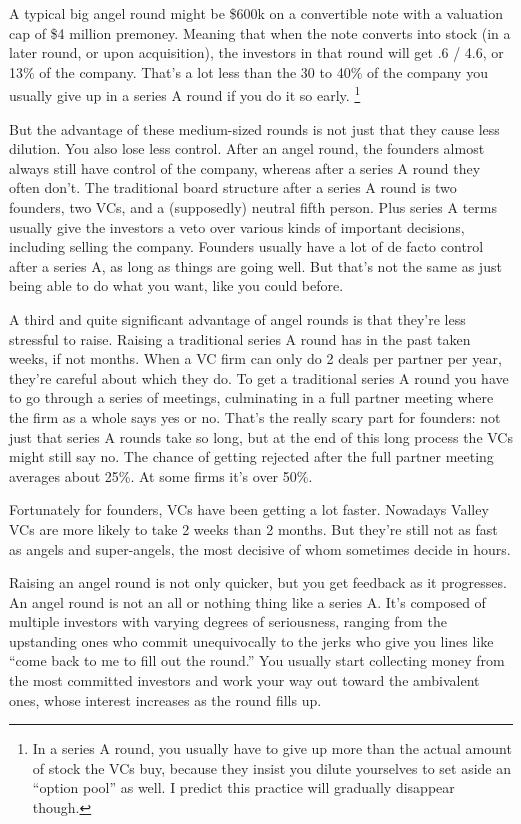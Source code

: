 A typical big angel round might be \$600k on a convertible note with a
valuation cap of \$4 million premoney. Meaning that when the note
converts into stock (in a later round, or upon acquisition), the
investors in that round will get .6 / 4.6, or 13\% of the company.
That's a lot less than the 30 to 40\% of the company you usually give up
in a series A round if you do it so early. \footnote{In a series A round, you usually have to give up more than the
actual amount of stock the VCs buy, because they insist you dilute
yourselves to set aside an ``option pool'' as well. I predict this
practice will gradually disappear though.}

But the advantage of these medium-sized rounds is not just that they
cause less dilution. You also lose less control. After an angel round,
the founders almost always still have control of the company, whereas
after a series A round they often don't. The traditional board structure
after a series A round is two founders, two VCs, and a (supposedly)
neutral fifth person. Plus series A terms usually give the investors a
veto over various kinds of important decisions, including selling the
company. Founders usually have a lot of de facto control after a series
A, as long as things are going well. But that's not the same as just
being able to do what you want, like you could before.

A third and quite significant advantage of angel rounds is that they're
less stressful to raise. Raising a traditional series A round has in the
past taken weeks, if not months. When a VC firm can only do 2 deals per
partner per year, they're careful about which they do. To get a
traditional series A round you have to go through a series of meetings,
culminating in a full partner meeting where the firm as a whole says yes
or no. That's the really scary part for founders: not just that series A
rounds take so long, but at the end of this long process the VCs might
still say no. The chance of getting rejected after the full partner
meeting averages about 25\%. At some firms it's over 50\%.

Fortunately for founders, VCs have been getting a lot faster. Nowadays
Valley VCs are more likely to take 2 weeks than 2 months. But they're
still not as fast as angels and super-angels, the most decisive of whom
sometimes decide in hours.

Raising an angel round is not only quicker, but you get feedback as it
progresses. An angel round is not an all or nothing thing like a series
A. It's composed of multiple investors with varying degrees of
seriousness, ranging from the upstanding ones who commit unequivocally
to the jerks who give you lines like ``come back to me to fill out the
round.'' You usually start collecting money from the most committed
investors and work your way out toward the ambivalent ones, whose
interest increases as the round fills up.


